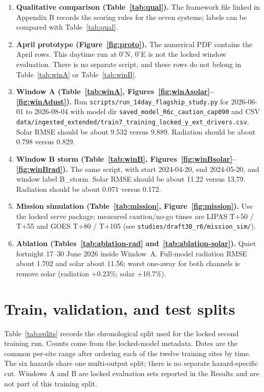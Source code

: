 \begin{enumerate}
\item \textbf{Qualitative comparison (Table~\ref{tab:qual}).} The framework file linked in Appendix B records the scoring rules for the seven systems; labels can be compared with Table~\ref{tab:qual}.
\item \textbf{April prototype (Figure~\ref{fig:proto}).} The numerical PDF contains the April rows. This daytime run at $0^{\circ}$N, $0^{\circ}$E is not the locked window evaluation. There is no separate script, and these rows do not belong in Table~\ref{tab:winA} or Table~\ref{tab:winB}.
\item \textbf{Window A (Table~\ref{tab:winA}, Figures~\ref{fig:winAsolar}--\ref{fig:winAdust}).} Run \texttt{scripts/run\_14day\_flagship\_study.py} for 2026-06-01 to 2026-08-04 with model dir \texttt{saved\_model\_R6c\_caution\_cap090} and CSV \texttt{data/ingested\_extended/train7\_training\_locked\_y\_ext\_drivers.csv}. Solar RMSE should be about 9.532 versus 9.889. Radiation should be about 0.798 versus 0.829.
\item \textbf{Window B storm (Table~\ref{tab:winB}, Figures~\ref{fig:winBsolar}--\ref{fig:winBrad}).} The same script, with start 2024-04-20, end 2024-05-20, and window label B\_storm. Solar RMSE should be about 11.22 versus 13.79. Radiation should be about 0.071 versus 0.172.
\item \textbf{Mission simulation (Table~\ref{tab:mission}, Figure~\ref{fig:mission}).} Use the locked serve package; measured caution/no-go times are LIPAS T+50 / T+55 and GOES T+80 / T+105 (see \texttt{studies/draft30\_r6/mission\_sim/}).
\item \textbf{Ablation (Tables~\ref{tab:ablation-rad} and~\ref{tab:ablation-solar}).} Quiet fortnight 17--30 June 2026 inside Window~A. Full-model radiation RMSE about 1.702 and solar about 11.56; worst one-away for both channels is remove solar (radiation +0.23\%; solar +10.7\%).
\end{enumerate}

\section{Train, validation, and test splits}
\label{app:splits}

Table~\ref{tab:splits} records the chronological split used for the locked second training run. Counts come from the locked-model metadata. Dates are the common per-site range after ordering each of the twelve training sites by time. The six hazards share one multi-output split; there is no separate hazard-specific cut. Windows A and B are locked evaluation sets reported in the Results and are not part of this training split.

